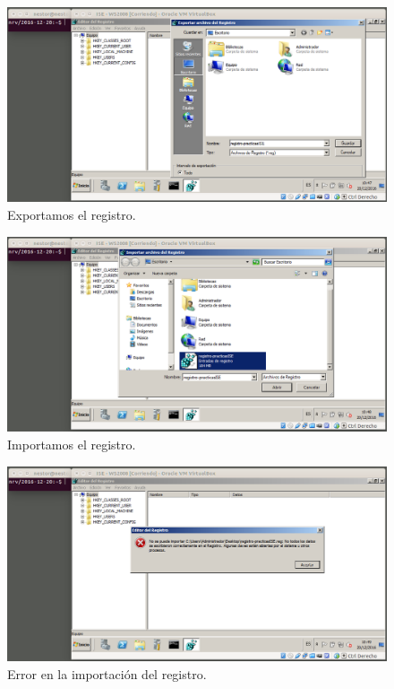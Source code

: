 \documentclass[a4paper,titlepage,12pt]{scrartcl}	%
\numberwithin{figure}{section} %
\numberwithin{table}{section} %
\begin{document}
	\begin{figure}[H]
		\includegraphics[width=\linewidth]{./Imagenes/3a-2.png}
		\vspace{-0.5cm}
		\caption[Exportamos el registro.]{Exportamos el registro.}
		\label{3a-2}
	\end{figure}
	
	\begin{figure}[H]
		\includegraphics[width=\linewidth]{./Imagenes/3a-3.png}
		\vspace{-0.5cm}
		\caption[Importamos el registro.]{Importamos el registro.}
		\label{3a-3}
	\end{figure}
	
	\begin{figure}[H]
		\includegraphics[width=\linewidth]{./Imagenes/3a-4.png}
		\vspace{-0.5cm}
		\caption[Error en la importación del registro.]{Error en la importación del registro.}
		\label{3a-4}
	\end{figure}
	
\end{document}

